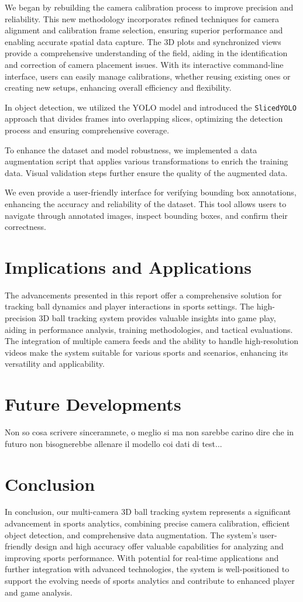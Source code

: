 \documentclass{template}
\begin{document}
We began by rebuilding the camera calibration process to improve precision and reliability. This new methodology incorporates refined techniques for camera alignment and calibration frame selection, ensuring superior performance and enabling accurate spatial data capture. 
The 3D plots and synchronized views provide a comprehensive understanding of the field, aiding in the identification and correction of camera placement issues. With its interactive command-line interface, users can easily manage calibrations, whether reusing existing ones or creating new setups, enhancing overall efficiency and flexibility.

In object detection, we utilized the YOLO model and introduced the \texttt{SlicedYOLO} approach that divides frames into overlapping slices, optimizing the detection process and ensuring comprehensive coverage. 

To enhance the dataset and model robustness, we implemented a data augmentation script that applies various transformations to enrich the training data. Visual validation steps further ensure the quality of the augmented data.

We even provide a user-friendly interface for verifying bounding box annotations, enhancing the accuracy and reliability of the dataset. This tool allows users to navigate through annotated images, inspect bounding boxes, and confirm their correctness.

\section{Implications and Applications}
The advancements presented in this report offer a comprehensive solution for tracking ball dynamics and player interactions in sports settings. The high-precision 3D ball tracking system provides valuable insights into game play, aiding in performance analysis, training methodologies, and tactical evaluations. The integration of multiple camera feeds and the ability to handle high-resolution videos make the system suitable for various sports and scenarios, enhancing its versatility and applicability.

\section{Future Developments}
Non so cosa scrivere sinceramnete, o meglio si ma non sarebbe carino dire che in futuro non bisognerebbe allenare il modello coi dati di test...

\section{Conclusion}
In conclusion, our multi-camera 3D ball tracking system represents a significant advancement in sports analytics, combining precise camera calibration, efficient object detection, and comprehensive data augmentation. The system's user-friendly design and high accuracy offer valuable capabilities for analyzing and improving sports performance. With potential for real-time applications and further integration with advanced technologies, the system is well-positioned to support the evolving needs of sports analytics and contribute to enhanced player and game analysis.
\end{document}
